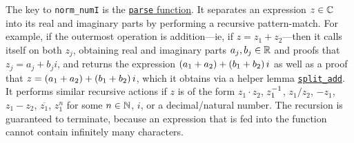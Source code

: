 The key to \lstinline|norm_numI| is the \href{https://github.com/thefundamentaltheor3m/Sphere-Packing-Lean/blob/05f51ee8f61972da1b0a5ee360c4c57c1b599cca/SpherePacking/Tactic/NormNumI.lean#L72}{\lstinline|parse| function}. It separates an expression $z \in \mathbb{C}$ into its real and imaginary parts by performing a recursive pattern-match. For example, if the outermost operation is addition---ie, if $z = z_1 + z_2$---then it calls itself on both $z_j$, obtaining real and imaginary parts $a_j, b_j \in \mathbb{R}$ and proofs that $z_j = a_j + b_ji$, and returns the expression $\left( a_1 + a_2 \right) + \left( b_1 + b_2 \right)i$ as well as a proof that $z = \left( a_1 + a_2 \right) + \left( b_1 + b_2 \right)i$, which it obtains via a helper lemma \href{https://github.com/thefundamentaltheor3m/Sphere-Packing-Lean/blob/05f51ee8f61972da1b0a5ee360c4c57c1b599cca/SpherePacking/Tactic/NormNumI.lean#L20}{\lstinline|split_add|}. It performs similar recursive actions if $z$ is of the form $z_1 \cdot z_2$, $z_1^{-1}$, $z_1 / z_2$, $-z_1$, $z_1 - z_2$, $\overline{z_1}$, $z_1^n$ for some $n \in \mathbb{N}$, $i$, or a decimal/natural number. The recursion is guaranteed to terminate, because an expression that is fed into the function cannot contain infinitely many characters.

